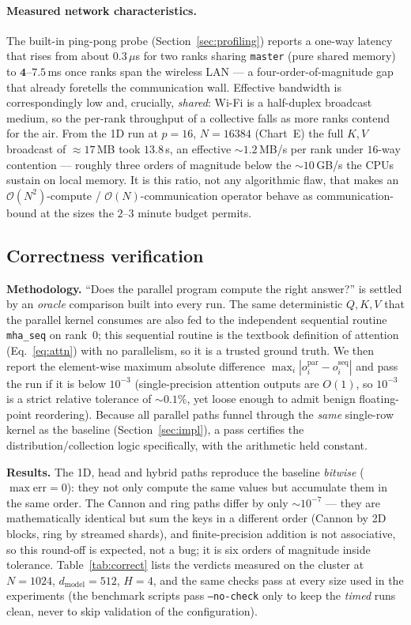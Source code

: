 \documentclass[11pt,a4paper]{article}
\newcommand{\code}[1]{\texttt{#1}}
\begin{document}
\paragraph{Measured network characteristics.} The built-in ping-pong probe
(Section~\ref{sec:profiling}) reports a one-way latency that rises from about
$0.3\,\mu$s for two ranks sharing \code{master} (pure shared memory) to
$\mathbf{4}$--$\mathbf{7.5}$\,ms once ranks span the wireless LAN --- a four-order-of-magnitude
gap that already foretells the communication wall. Effective bandwidth is
correspondingly low and, crucially, \emph{shared}: Wi-Fi is a half-duplex broadcast
medium, so the per-rank throughput of a collective falls as more ranks contend for
the air. From the 1D run at $p=16$, $N=16384$ (Chart~E) the full $K,V$ broadcast of
$\approx\!17$\,MB took $13.8$\,s, an effective $\sim\!1.2$\,MB/s per rank under
$16$-way contention --- roughly three orders of magnitude below the $\sim\!10$\,GB/s
the CPUs sustain on local memory. It is this ratio, not any algorithmic flaw, that
makes an $\mathcal{O}(N^2)$-compute / $\mathcal{O}(N)$-communication operator behave
as communication-bound at the sizes the $2$--$3$ minute budget permits.

\subsection{Correctness verification}
\label{sec:correctness}
\textbf{Methodology.} ``Does the parallel program compute the right answer?'' is
settled by an \emph{oracle} comparison built into every run. The same deterministic
$Q,K,V$ that the parallel kernel consumes are also fed to the independent sequential
routine \code{mha\_seq} on rank~0; this sequential routine is the textbook
definition of attention (Eq.~\ref{eq:attn}) with no parallelism, so it is a trusted
ground truth. We then report the element-wise maximum absolute difference
$\max_i|o^{\text{par}}_i-o^{\text{seq}}_i|$ and pass the run if it is below
$10^{-3}$ (single-precision attention outputs are $O(1)$, so $10^{-3}$ is a strict
relative tolerance of $\sim\!0.1\%$, yet loose enough to admit benign floating-point
reordering). Because all parallel paths funnel through the \emph{same}
single-row kernel as the baseline (Section~\ref{sec:impl}), a pass certifies the
distribution/collection logic specifically, with the arithmetic held constant.

\textbf{Results.} The 1D, head and hybrid paths reproduce the baseline
\emph{bitwise} ($\max\text{err}=0$): they not only compute the same values but
accumulate them in the same order. The Cannon and ring paths differ by only
$\sim\!10^{-7}$ --- they are mathematically identical but sum the keys in a
different order (Cannon by 2D blocks, ring by streamed shards), and finite-precision
addition is not associative, so this round-off is expected, not a bug; it is six
orders of magnitude inside tolerance. Table~\ref{tab:correct} lists the verdicts
measured on the cluster at $N=1024$, $d_{\text{model}}=512$, $H=4$, and the same
checks pass at every size used in the experiments (the benchmark scripts pass
\code{--no-check} only to keep the \emph{timed} runs clean, never to skip validation
of the configuration).
\end{document}
